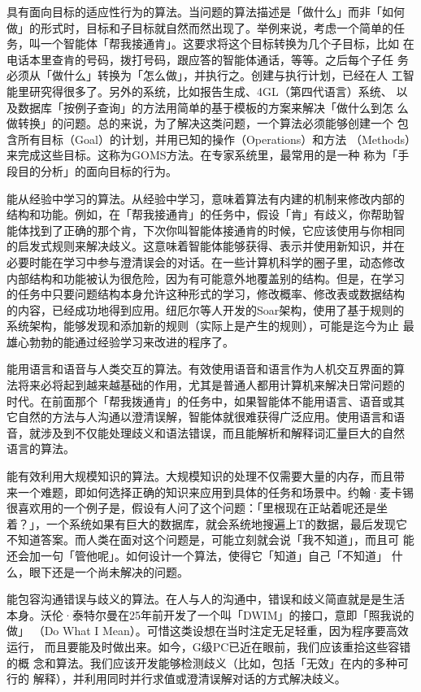 \documentclass[12pt,a4paper]{article}
\begin{document}
具有面向目标的适应性行为的算法。当问题的算法描述是「做什么」而非「如何
做」的形式时，目标和子目标就自然而然出现了。举例来说，考虑一个简单的任
务，叫一个智能体「帮我接通肯」。这要求将这个目标转换为几个子目标，比如
在电话本里查肯的号码，拨打号码，跟应答的智能体通话，等等。之后每个子任
务必须从「做什么」转换为「怎么做」，并执行之。创建与执行计划，已经在人
工智能里研究得很多了。另外的系统，比如报告生成、4GL（第四代语言）系统、
以及数据库「按例子查询」的方法用简单的基于模板的方案来解决「做什么到怎
么做转换」的问题。总的来说，为了解决这类问题，一个算法必须能够创建一个
包含所有目标（Goal）的计划，并用已知的操作（Operations）和方法
（Methods）来完成这些目标。这称为GOMS方法。在专家系统里，最常用的是一种
称为「手段目的分析」的面向目标的行为。

能从经验中学习的算法。从经验中学习，意味着算法有内建的机制来修改内部的
结构和功能。例如，在「帮我接通肯」的任务中，假设「肯」有歧义，你帮助智
能体找到了正确的那个肯，下次你叫智能体接通肯的时候，它应该使用与你相同
的启发式规则来解决歧义。这意味着智能体能够获得、表示并使用新知识，并在
必要时能在学习中参与澄清误会的对话。在一些计算机科学的圈子里，动态修改
内部结构和功能被认为很危险，因为有可能意外地覆盖别的结构。但是，在学习
的任务中只要问题结构本身允许这种形式的学习，修改概率、修改表或数据结构
的内容，已经成功地得到应用。纽厄尔等人开发的Soar架构，使用了基于规则的
系统架构，能够发现和添加新的规则（实际上是产生的规则），可能是迄今为止
最雄心勃勃的能通过经验学习来改进的程序了。

能用语言和语音与人类交互的算法。有效使用语音和语言作为人机交互界面的算
法将来必将起到越来越基础的作用，尤其是普通人都用计算机来解决日常问题的
时代。在前面那个「帮我拨通肯」的任务中，如果智能体不能用语言、语音或其
它自然的方法与人沟通以澄清误解，智能体就很难获得广泛应用。使用语言和语
音，就涉及到不仅能处理歧义和语法错误，而且能解析和解释词汇量巨大的自然
语言的算法。

能有效利用大规模知识的算法。大规模知识的处理不仅需要大量的内存，而且带
来一个难题，即如何选择正确的知识来应用到具体的任务和场景中。约翰·麦卡锡
很喜欢用的一个例子是，假设有人问了这个问题：「里根现在正站着呢还是坐
着？」，一个系统如果有巨大的数据库，就会系统地搜遍上T的数据，最后发现它
不知道答案。而人类在面对这个问题是，可能立刻就会说「我不知道」，而且可
能还会加一句「管他呢」。如何设计一个算法，使得它「知道」自己「不知道」
什么，眼下还是一个尚未解决的问题。

能包容沟通错误与歧义的算法。在人与人的沟通中，错误和歧义简直就是是生活
本身。沃伦·泰特尔曼在25年前开发了一个叫「DWIM」的接口，意即「照我说的做」
（Do What I Mean）。可惜这类设想在当时注定无足轻重，因为程序要高效运行，
而且要能及时做出来。如今，G级PC已近在眼前，我们应该重拾这些容错的概
念和算法。我们应该开发能够检测歧义（比如，包括「无效」在内的多种可行的
解释），并利用同时并行求值或澄清误解对话的方式解决歧义。
\end{document}
